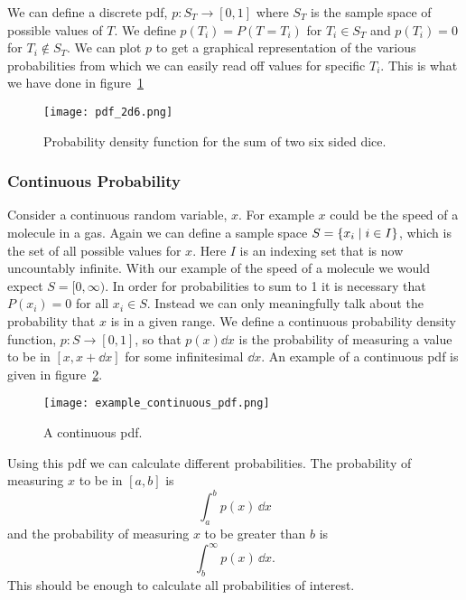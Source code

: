     We can define a discrete \acrfull{pdf}, \(p\colon S_T \rightarrow [0, 1]\) where \(S_T\) is the sample space of possible values of \(T\).
    We define \(p(T_i) = P(T = T_i)\) for \(T_i \in S_T\) and \(p(T_i) = 0\) for \(T_i\notin S_T\).
    We can plot \(p\) to get a graphical representation of the various probabilities from which we can easily read off values for specific \(T_i\).
    This is what we have done in figure~\ref{fig:2d6 pdf}
    \begin{figure}[ht]
        \centering
        \texttt{[image: pdf\_2d6.png]}
        \caption{Probability density function for the sum of two six sided dice.}
        \label{fig:2d6 pdf}
    \end{figure}
    
    \subsubsection{Continuous Probability}
    Consider a continuous random variable, \(x\).
    For example \(x\) could be the speed of a molecule in a gas.
    Again we can define a sample space \(S = \{x_i\mid i\in I\}\), which is the set of all possible values for \(x\).
    Here \(I\) is an indexing set that is now uncountably infinite.
    With our example of the speed of a molecule we would expect \(S = [0, \infty)\).
    In order for probabilities to sum to 1 it is necessary that \(P(x_i) = 0\) for all \(x_i \in S\).
    Instead we can only meaningfully talk about the probability that \(x\) is in a given range.
    We define a continuous probability density function, \(p\colon S\rightarrow [0, 1]\), so that \(p(x)\dd x\) is the probability of measuring a value to be in \([x, x + \dd x]\) for some infinitesimal \(\dd x\).
    An example of a continuous \acrshort{pdf} is given in figure~\ref{fig:example continuous pdf}.
    \begin{figure}[ht]
        \centering
        \texttt{[image: example\_continuous\_pdf.png]}
        \caption{A continuous \acrshort{pdf}.}
        \label{fig:example continuous pdf}
    \end{figure}
    Using this \acrshort{pdf} we can calculate different probabilities.
    The probability of measuring \(x\) to be in \([a, b]\) is
    \[\int_a^b p(x)\,\dd x\]
    and the probability of measuring \(x\) to be greater than \(b\) is
    \[\int_b^\infty p(x)\,\dd x.\]
    This should be enough to calculate all probabilities of interest.
    

